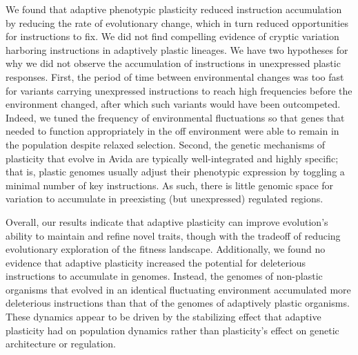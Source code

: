 We found that adaptive phenotypic plasticity reduced  instruction accumulation by reducing the rate of evolutionary change, which in turn reduced opportunities for  instructions to fix.
We did not find compelling evidence of cryptic variation harboring  instructions in adaptively plastic lineages.
We have two hypotheses for why we did not observe the accumulation of  instructions in unexpressed plastic responses.
First, the period of time between environmental changes was too fast for variants carrying unexpressed  instructions to reach high frequencies before the environment changed, after which such variants would have been outcompeted.
Indeed, we tuned the frequency of environmental fluctuations so that genes that needed to function appropriately in the off environment were able to remain in the population despite relaxed selection.
Second, the genetic mechanisms of plasticity that evolve in Avida are typically well-integrated and highly specific; that is, plastic genomes usually adjust their phenotypic expression by toggling a minimal number of key instructions. 
As such, there is little genomic space for variation to accumulate in preexisting (but unexpressed) regulated regions.



Overall, our results indicate that adaptive plasticity can improve evolution's ability to maintain and refine novel traits, though with the tradeoff of reducing evolutionary exploration of the fitness landscape.
Additionally, we found no evidence that adaptive plasticity increased the potential for deleterious instructions to accumulate in genomes.
Instead, the genomes of non-plastic organisms that evolved in an identical fluctuating environment accumulated more deleterious instructions than that of the genomes of adaptively plastic organisms. 
These dynamics appear to be driven by the stabilizing effect that adaptive plasticity had on population dynamics rather than plasticity's effect on genetic architecture or regulation.

